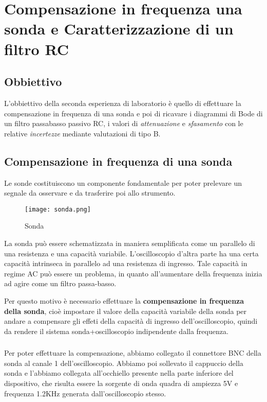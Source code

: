 \chapter{Compensazione in frequenza una sonda  e Caratterizzazione di un filtro RC}
\label{chap:Prova2}
\section*{Obbiettivo}
L'obbiettivo della seconda esperienza di laboratorio è quello di effettuare la compensazione in frequenza di una sonda e poi di ricavare i diagrammi di Bode di un filtro passabasso passivo RC, i valori di \emph{attenuazione} e \emph{sfasamento} con le relative \emph{incertezze} mediante valutazioni di tipo B.

\section{Compensazione in frequenza di una sonda}
Le sonde costituiscono un componente fondamentale per poter prelevare un
segnale da osservare e da trasferire poi allo strumento.

\begin{figure}[h]
    \centering
    \texttt{[image: sonda.png]}
    \caption{Sonda}
    \label{fig:sonda}
\end{figure}

La sonda può essere schematizzata in maniera semplificata come un parallelo di una resistenza e una capacità variabile. L'oscilloscopio d'altra parte ha una certa capacità intrinseca in parallelo ad una resistenza di ingresso. Tale capacità in regime AC può essere un problema, in quanto all'aumentare della frequenza inizia ad agire come un filtro passa-basso.

Per questo motivo è necessario effettuare la \textbf{compensazione in frequenza della sonda}, cioè impostare il valore della capacità variabile della sonda per andare a compensare gli effeti della capacità di ingresso dell'oscilloscopio, quindi da rendere il sistema sonda+oscilloscopio indipendente dalla frequenza.

\subsection*{}
Per poter effettuare la compensazione, abbiamo collegato il connettore BNC della sonda al canale 1 dell'oscilloscopio. Abbiamo poi sollevato il cappuccio della sonda e l'abbiamo collegata all'occhiello presente nella parte inferiore del dispositivo, che risulta essere la sorgente di onda quadra di ampiezza 5V e frequenza 1.2KHz generata dall'oscilloscopio stesso.


